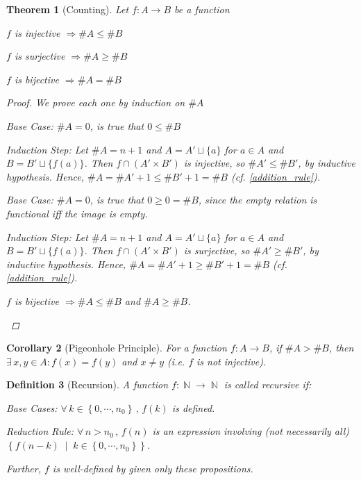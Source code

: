 \documentclass[12pt]{article}
\let\RA\Rightarrow
\newcommand{\set}[2]{\left\{{#1}\;\middle|\;{#2}\right\}}
\newcommand{\Forall}[1]{\forall\,{#1}\,,\,}
\newcommand{\Exist}[1]{\exists\,{#1}:}
\newcommand{\seq}[2][0]{\left\{{#1},\cdots,{#2}\right\}}
\DeclareMathOperator{\N}{\mathbb{N}}
\newtheorem{theorem}{Theorem}[subsection]
\newtheorem{definition}[theorem]{Definition}
\newtheorem{corollary}[theorem]{Corollary}
\begin{document}
\begin{theorem}[Counting]
  Let $f:A\to B$ be a function
  \begin{compactenum}
    \item $f$ is injective $\RA\#A\leq \#B$
    \item $f$ is surjective $\RA \#A\geq \#B$
    \item $f$ is bijective $\RA \#A = \#B$
  \end{compactenum}
  \begin{proof}
    We prove each one by induction on $\# A$
    \begin{compactenum}
      \item \begin{compactitem}
        \item Base Case: $\#A=0$, is true that $0\leq \#B$
        \item Induction Step: Let $\# A=n+1$ and $A=A'\sqcup\{a\}$ for $a\in A$ and $B=B'\sqcup\{f(a)\}$. Then $f\cap (A'\times B')$ is injective, so $\#A'\leq\#B'$, by inductive hypothesis. Hence, $\#A=\#A'+1\leq\#B'+1=\#B$ (cf. \ref{addition_rule}).
      \end{compactitem}
      \item \begin{compactitem}
        \item Base Case: $\#A=0$, is true that $0\geq 0=\#B$, since the empty relation is functional iff the image is empty.
        \item Induction Step: Let $\# A=n+1$ and $A=A'\sqcup\{a\}$ for $a\in A$ and $B=B'\sqcup\{f(a)\}$. Then $f\cap (A'\times B')$ is surjective, so $\#A'\geq\#B'$, by inductive hypothesis. Hence, $\#A=\#A'+1\geq\#B'+1=\#B$ (cf. \ref{addition_rule}).
      \end{compactitem}
      \item $f$ is bijective $\RA \# A \leq \# B$ and $\# A \geq \# B$.
    \end{compactenum}
  \end{proof}
\end{theorem}

\begin{corollary}[Pigeonhole Principle]
  For a function $f:A\to B$, if $\#A>\#B$, then $\Exist{x,y\in A}f(x)=f(y)$ and $x\neq y$ (i.e. $f$ is not injective). 
\end{corollary}

\begin{definition}[Recursion]
  A function $f:\N\to\N$ is called recursive if:
  \begin{compactitem}
    \item Base Cases: $\Forall{k\in\seq{n_0}} f(k)$ is defined.
    \item Reduction Rule: $\Forall{n>n_0} f(n)$ is an expression involving (not necessarily all) $\set{f(n-k)}{k\in\seq{n_0}}$.
  \end{compactitem}
  Further, $f$ is well-defined by given only these propositions.
\end{definition}
\end{document}
